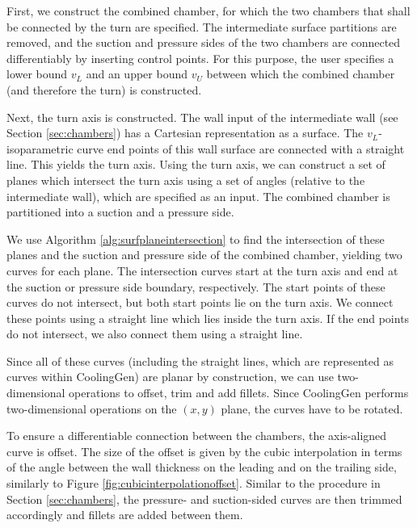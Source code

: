 \documentclass[a4paper, 11pt]{report}
\theoremstyle{definition}
\begin{document}
	First, we construct the combined chamber, for which the two chambers that shall be connected by the turn are specified. The intermediate surface partitions are removed, and the suction and pressure sides of the two chambers are connected differentiably by inserting control points. For this purpose, the user specifies a lower bound $v_L$ and an upper bound $v_U$ between which the combined chamber (and therefore the turn) is constructed.

	Next, the turn axis is constructed. The wall input of the intermediate wall (see Section \ref{sec:chambers}) has a Cartesian representation as a surface. The $v_L$-isoparametric curve end points of this wall surface are connected with a straight line. This yields the turn axis. Using the turn axis, we can construct a set of planes which intersect the turn axis using a set of angles (relative to the intermediate wall), which are specified as an input. The combined chamber is partitioned into a suction and a pressure side.

	We use Algorithm \ref{alg:surfplaneintersection} to find the intersection of these planes and the suction and pressure side of the combined chamber, yielding two curves for each plane. The intersection curves start at the turn axis and end at the suction or pressure side boundary, respectively. The start points of these curves do not intersect, but both start points lie on the turn axis. We connect these points using a straight line which lies inside the turn axis. If the end points do not intersect, we also connect them using a straight line.

	Since all of these curves (including the straight lines, which are represented as curves within CoolingGen) are planar by construction, we can use two-dimensional operations to offset, trim and add fillets. Since CoolingGen performs two-dimensional operations on the $(x,y)$ plane, the curves have to be rotated.

	To ensure a differentiable connection between the chambers, the axis-aligned curve is offset. The size of the offset is given by the cubic interpolation in terms of the angle between the wall thickness on the leading and on the trailing side, similarly to Figure \ref{fig:cubicinterpolationoffset}. Similar to the procedure in Section \ref{sec:chambers}, the pressure- and suction-sided curves are then trimmed accordingly and fillets are added between them.
\end{document}
